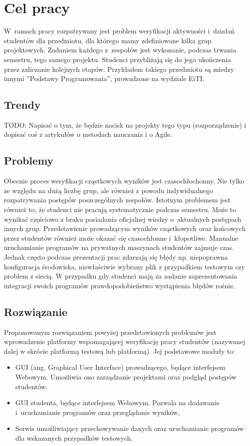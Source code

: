 \chapter{Cel pracy}

W~ramach pracy rozpatrywany jest problem weryfikacji aktywności i~działań studentów dla przedmiotu, dla którego mamy zdefiniowane kilka grup projektowych.
Zadaniem każdego z~zespołów jest wykonanie, podczas trwania semestru, tego samego projektu.
Studenci przybliżają się do jego ukończenia przez zaliczanie kolejnych etapów.
Przykładem takiego przedmiotu są miedzy innymi ”Podstawy Programowania”, prowadzone na wydziale EiTI.

\section{Trendy}

TODO:
Napisać o tym, że będzie nacisk na projekty tego typu (rozporządzenie) i dopisać coś z artykułów o metodach nauczania i o Agile.

\section {Problemy}

Obecnie proces weryfikacji cząstkowych wyników jest czasochłochonny.
Nie tylko ze względu na dużą liczbę grup, ale również z powodu indywidualnego rozpatrywania postępów poszczególnych zespołów.
Istotnym problemem jest również to, że studenci nie pracują systematycznie podczas semestru.
Może to wynikać częściowo z braku posiadania oficjalnej wiedzy o~aktualnych postępach innych grup.
Przedstawienie prowadzącym wyników cząstkowych oraz końcowych przez studentów również może okazać się czasochłonne i~kłopotliwe.
Manualne uruchamianie programów na prywatnych maszynach studentów zajmuje czas.
Jednak często podczas prezentacji prac zdarzają się błędy np. niepoprawna konfiguracja środowiska, niewłaściwie wybrany plik z przypadkiem testowym czy problem z siecią.
W przypadku gdy studenci mają za zadanie zaprezentowania integracji swoich programów prawdopodobieństwo wystąpienia błędów rośnie.

\section {Rozwiązanie}

Proponowanym rozwiązaniem powyżej przedstawionych problemów jest wprowadzenie platformy wspomagającej weryfikację pracy studentów (nazywanej dalej w skrócie platformą testową lub platformą).
Jej podstawowe moduły to:
\begin{itemize}
    \item GUI (ang. Graphical User Interface) prowadzącego, będące interfejsem Webowym. Umożliwia ono zarządzanie projektami oraz podgląd postępów studentów.
    \item GUI studenta, będące interfejsem Webowym. Pozwala na dodawanie i~uruchamianie programów oraz przeglądanie wyników,
    \item Serwis umożliwiający przechowywanie danych oraz uruchamianie programów dla wskazanych przypadków testowych.
\end{itemize}

